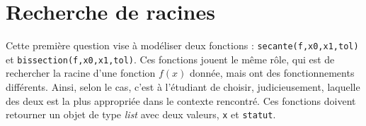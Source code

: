 \documentclass[12pt]{article}
\begin{document}
\sloppy %




\renewcommand{\contentsname}{Table des matières}
\renewcommand{\listfigurename}{Table des figures}
\renewcommand{\listtablename}{Liste des tableaux}

\tableofcontents
\listoffigures
\listoftables
\newpage


\section{Recherche de racines}

    Cette première question vise à modéliser deux fonctions : \texttt{secante(f,x0,x1,tol)} et \texttt{bissection(f,x0,x1,tol)}. Ces fonctions jouent le même rôle, qui est de rechercher la racine d'une fonction $f(x)$ donnée, mais ont des fonctionnements différents. Ainsi, selon le cas, c'est à l'étudiant de choisir, judicieusement, laquelle des deux est la plus appropriée dans le contexte rencontré. Ces fonctions doivent retourner un objet de type \textit{list} avec deux valeurs, \texttt{x} et \texttt{statut}.
    
\end{document}
